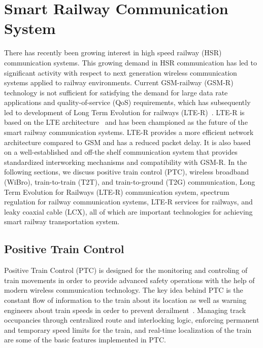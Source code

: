 \chapter{Smart Railway Communication System}
\label{chapter2}

There has recently been growing interest in high speed railway (HSR) communication systems. This growing demand in HSR communication has led to significant activity with respect to next generation wireless communication systems applied to railway environments. Current GSM-railway (GSM-R) technology is not sufficient for satisfying the demand for large data rate applications and quality-of-service (QoS) requirements, which has subsequently led to development of Long Term Evolution for railways (LTE-R)~\cite{7553613}. LTE-R is based on the LTE architecture~\cite{7553613} and has been championed as the future of the smart railway communication systems. LTE-R provides a more efficient network architecture compared to GSM and has a reduced packet delay. It is also based on a well-established and off-the shelf communication system that provides standardized interworking mechanisms and compatibility with GSM-R. In the following sections, we discuss positive train control (PTC), wireless broadband (WiBro), train-to-train (T2T), and train-to-ground (T2G) communication, Long Term Evolution for Railways (LTE-R) communication system, spectrum regulation for railway communication systems, LTE-R services for railways, and leaky coaxial cable (LCX), all of which are important technologies for achieving smart railway transportation system.

\section{Positive Train Control}
Positive Train Control (PTC) is designed for the monitoring and controling of train movements in order to provide advanced safety operations with the help of modern wireless communication technology. The key idea behind PTC is the constant flow of information to the train about its location as well as warning engineers about train speeds in order to prevent derailment~\cite{nytimes}. Managing track occupancies through centralized route and interlocking logic, enforcing permanent and temporary speed limits for the train, and real-time localization of the train are some of the basic features implemented in PTC. 


